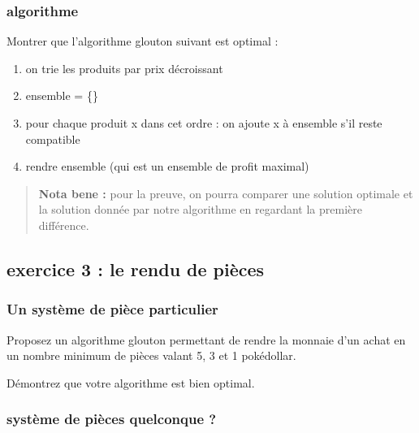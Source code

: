 \documentclass[
]{article}
\providecommand{\tightlist}{%
  \setlength{\itemsep}{0pt}\setlength{\parskip}{0pt}}
\begin{document}
\hypertarget{algorithme}{%
\subsubsection{algorithme}\label{algorithme}}

Montrer que l'algorithme glouton suivant est optimal :

\begin{enumerate}
\def\labelenumi{\arabic{enumi}.}
\tightlist
\item
  on trie les produits par prix décroissant
\item
  ensemble = \{\}
\item
  pour chaque produit x dans cet ordre : on ajoute x à ensemble s'il
  reste compatible
\item
  rendre ensemble (qui est un ensemble de profit maximal)
\end{enumerate}

\begin{quote}
\textbf{Nota bene :} pour la preuve, on pourra comparer une solution
optimale et la solution donnée par notre algorithme en regardant la
première différence.
\end{quote}

\hypertarget{exercice-3-le-rendu-de-piuxe8ces}{%
\subsection{exercice 3 : le rendu de
pièces}\label{exercice-3-le-rendu-de-piuxe8ces}}

\hypertarget{un-systuxe8me-de-piuxe8ce-particulier}{%
\subsubsection{Un système de pièce
particulier}\label{un-systuxe8me-de-piuxe8ce-particulier}}

Proposez un algorithme glouton permettant de rendre la monnaie d'un
achat en un nombre minimum de pièces valant 5, 3 et 1 pokédollar.

Démontrez que votre algorithme est bien optimal.

\hypertarget{systuxe8me-de-piuxe8ces-quelconque}{%
\subsubsection{système de pièces quelconque
?}\label{systuxe8me-de-piuxe8ces-quelconque}}
\end{document}
